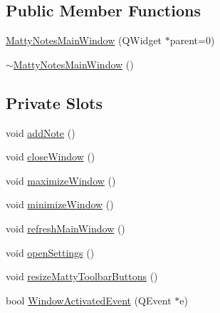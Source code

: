 \subsection*{Public Member Functions}
\begin{DoxyCompactItemize}
\item 
\hyperlink{class_matty_notes_main_window_aa788ae37a712be6e1ea281c349342908}{Matty\+Notes\+Main\+Window} (Q\+Widget $\ast$parent=0)
\item 
\hyperlink{class_matty_notes_main_window_a691c1dfd2497d55387fe8ee6177c92d7}{$\sim$\+Matty\+Notes\+Main\+Window} ()
\end{DoxyCompactItemize}
\subsection*{Private Slots}
\begin{DoxyCompactItemize}
\item 
void \hyperlink{class_matty_notes_main_window_af77c5a79f0a941dbb980776df6a8b1eb}{add\+Note} ()
\item 
void \hyperlink{class_matty_notes_main_window_ad4e9dfde3914909695d85c12e3d9894c}{close\+Window} ()
\item 
void \hyperlink{class_matty_notes_main_window_aa04cca9a2d55f2f1625bd18892a8814a}{maximize\+Window} ()
\item 
void \hyperlink{class_matty_notes_main_window_a91131115f70c09c62b50bf71bc4b0d73}{minimize\+Window} ()
\item 
void \hyperlink{class_matty_notes_main_window_a12025cd56092bb34c6451a92197b69a1}{refresh\+Main\+Window} ()
\item 
void \hyperlink{class_matty_notes_main_window_a174545072bf37c8b69a8447855b636f7}{open\+Settings} ()
\item 
void \hyperlink{class_matty_notes_main_window_a7fd491b7b955e57d8f93143c7c5e784b}{resize\+Matty\+Toolbar\+Buttons} ()
\item 
bool \hyperlink{class_matty_notes_main_window_acb9472c3ba8430272c29864b5d046ea3}{Window\+Activated\+Event} (Q\+Event $\ast$e)
\end{DoxyCompactItemize}
